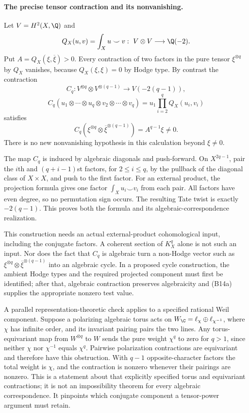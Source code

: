 \paragraph{The precise tensor contraction and its nonvanishing.}
Let $V=H^2(X,\Q)$ and
\[
 Q_X(u,v)=\int_Xu\smile v:\ V\otimes V\longrightarrow\Q(-2).
\]
Put $A=Q_X(\xi,\overline\xi)>0$. Every contraction of two factors in the pure tensor $\xi^{\otimes q}$ by $Q_X$ vanishes, because $Q_X(\xi,\xi)=0$ by Hodge type. By contrast the contraction
\[
 C_q:V^{\otimes q}\otimes V^{\otimes(q-1)}
       \longrightarrow V(-2(q-1)),
\]
\[
 C_q(u_1\otimes\cdots\otimes u_q\otimes v_2\otimes\cdots\otimes v_q)
       =u_1\prod_{i=2}^q Q_X(u_i,v_i)
\]
satisfies
\[
 C_q(\xi^{\otimes q}\otimes\overline\xi^{\otimes(q-1)})
           =A^{q-1}\xi\ne0.
 \tag{B14a}
\]
There is no new nonvanishing hypothesis in this calculation beyond $\xi\ne0$.

The map $C_q$ is induced by algebraic diagonals and push-forward. On $X^{2q-1}$, pair the $i$th and $(q+i-1)$st factors, for $2\leq i\leq q$, by the pullback of the diagonal class of $X\times X$, and push to the first factor. For an external product, the projection formula gives one factor $\int_Xu_i\smile v_i$ from each pair. All factors have even degree, so no permutation sign occurs. The resulting Tate twist is exactly $-2(q-1)$. This proves both the formula and its algebraic-correspondence realization.

This construction needs an actual external-product cohomological input, including the conjugate factors. A coherent section of $K_X^q$ alone is not such an input. Nor does the fact that $C_q$ is algebraic turn a non-Hodge vector such as $\xi^{\otimes q}\otimes\overline\xi^{\otimes(q-1)}$ into an algebraic cycle. In a proposed cycle construction, the ambient Hodge types and the required projected component must first be identified; after that, algebraic contraction preserves algebraicity and (B14a) supplies the appropriate nonzero test value.

A parallel representation-theoretic check applies to a specified rational Weil component. Suppose a polarizing algebraic torus acts on
$W_\C=\ell_\chi\oplus\ell_{\chi^{-1}}$, where $\chi$ has infinite order, and its invariant pairing pairs the two lines. Any torus-equivariant map from $W^{\otimes q}$ to $W$ sends the pure weight $\chi^q$ to zero for $q>1$, since neither $\chi$ nor $\chi^{-1}$ equals $\chi^q$. Pairwise polarization contractions are equivariant and therefore have this obstruction. With $q-1$ opposite-character factors the total weight is $\chi$, and the contraction is nonzero whenever their pairings are nonzero. This is a statement about that explicitly specified torus and equivariant contractions; it is not an impossibility theorem for every algebraic correspondence. It pinpoints which conjugate component a tensor-power argument must retain.

